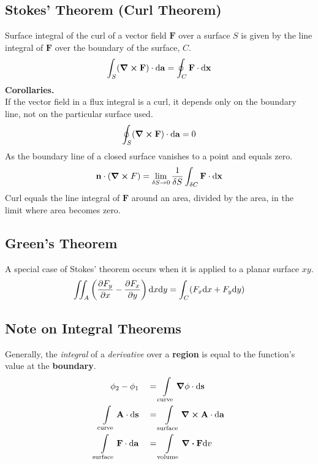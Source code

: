 \subsection*{Stokes' Theorem (Curl Theorem)}
Surface integral of the curl of a vector field $\mathbf{F}$ over a surface $S$ is given by the line integral of $\mathbf{F}$ over the boundary of the surface, $C$.
\begin{equation*}
    \int_S(\curl \mathbf{F})\cdot \differential \mathbf{a} = \oint_C \mathbf{F} \cdot \differential \mathbf{x}
\end{equation*}
\textbf{Corollaries.} \\
If the vector field in a flux integral is a curl, it depends only on the boundary line, not on the particular surface used.
\begin{equation*}
    \oint_S(\curl \mathbf{F}) \cdot \differential \mathbf{a} = 0
\end{equation*}
As the boundary line of a closed surface vanishes to a point and equals zero.
\begin{equation*}
    \mathbf{n} \cdot (\curl F) = \lim_{\delta S \rightarrow 0} \frac{1}{\delta S} \int_{\delta C} \mathbf{F} \cdot \differential \mathbf{x}
\end{equation*}
Curl equals the line integral of $\mathbf{F}$ around an area, divided by the area, in the limit where area becomes zero.
\subsection*{Green's Theorem}
A special case of Stokes' theorem occurs when it is applied to a planar surface $xy$.
\begin{equation*}
    \iint_A \left(\pdv{F_y}{x}-\pdv{F_x}{y}\right) \differential x \differential y = \int_C (F_x \differential x + F_y \differential y)
\end{equation*}
\subsection*{Note on Integral Theorems}
Generally, the \textit{integral} of a \textit{derivative} over a \textbf{region} is equal to the function's value at the \textbf{boundary}.
\begin{equation*}
    \begin{aligned}
    \phi_2 - \phi_1 \quad &= \int\limits_{\mathrm{curve}} \grad \phi \cdot \differential \mathbf{s} \\
    \int\limits_{\mathrm{curve}} \mathbf{A} \cdot \differential \mathbf{s} \quad &= \int\limits_{\mathrm{surface}} \curl \mathbf{A} \cdot \differential \mathbf{a} \\
    \int\limits_{\mathrm{surface}} \mathbf{F} \cdot \differential \mathbf{a} \quad &= \int\limits_{\mathrm{volume}} \divergence \mathbf{F} \differential v
\end{aligned}
\end{equation*}
